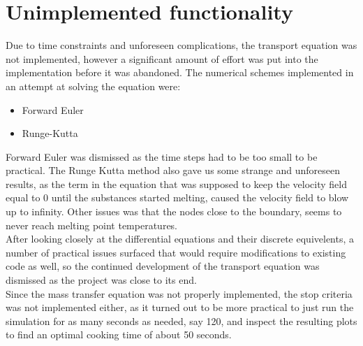 \section{Unimplemented functionality}

Due to time constraints and unforeseen complications, the transport equation was not implemented, 
however a significant amount of effort was put into the implementation before it was 
abandoned. The numerical schemes implemented in an attempt at solving the
equation were:

\begin{itemize}
  \item Forward Euler
  \item Runge-Kutta
\end{itemize} 

Forward Euler was dismissed as the time steps had to be too small to be practical.
The Runge Kutta method also gave us some strange and unforeseen results, as the term in 
the equation that was supposed to keep the velocity field equal to $0$ until the substances
started melting, caused the velocity field to blow up to infinity. Other issues was that
the nodes close to the boundary, seems to never reach melting point
temperatures.\\

After looking closely at the differential equations and their discrete equivelents, a number
of practical issues surfaced that would require modifications to existing code
as well, so the continued development of the transport equation was dismissed
as the project was close to its end.\\

Since the mass transfer equation was not properly implemented, the stop criteria was not 
implemented either, as it turned out to be more practical to just run the simulation for as 
many seconds as needed, say 120, and inspect the resulting plots to find an
optimal cooking time of about 50 seconds.
